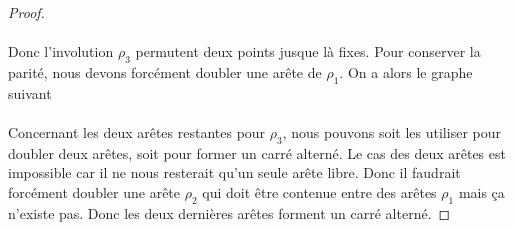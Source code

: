 \begin{proof}
  \paragraph{}
  Donc l'involution $\rho_3$ permutent deux points jusque là fixes. Pour conserver la parité, nous devons forcément doubler une arête de $\rho_1$. On a alors le graphe suivant

  \begin{figure}[H]
    \begin{center}
      \caption{}
    \end{center}
  \end{figure}

  \paragraph{}
  Concernant les deux arêtes restantes pour $\rho_3$, nous pouvons soit les utiliser pour doubler deux arêtes, soit pour former un carré alterné. Le cas des deux arêtes est impossible car il ne nous resterait qu'un seule arête libre. Donc il faudrait forcément doubler une arête $\rho_2$ qui doit être contenue entre des arêtes $\rho_1$ mais ça n'existe pas. Donc les deux dernières arêtes forment un carré alterné.


\end{proof}
